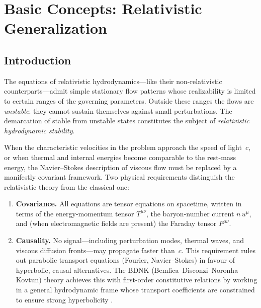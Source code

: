 
\chapter{Basic Concepts: Relativistic Generalization}
\label{ch:rel-1}

\section{Introduction}
\label{sec:rel-1-1}

The equations of relativistic hydrodynamics---like their
non-relativistic counterparts---admit simple stationary flow
patterns whose realizability is limited to certain ranges of the
governing parameters.  Outside these ranges the flows are
\emph{unstable}: they cannot sustain themselves against small
perturbations.  The demarcation of stable from unstable states
constitutes the subject of \emph{relativistic hydrodynamic stability}.

When the characteristic velocities in the problem approach the speed
of light~$c$, or when thermal and internal energies become comparable
to the rest-mass energy, the Navier--Stokes description of viscous
flow must be replaced by a manifestly covariant framework.  Two
physical requirements distinguish the relativistic theory from the
classical one:
\begin{enumerate}
\item \textbf{Covariance.}  All equations are tensor equations on
  spacetime, written in terms of the energy-momentum tensor
  $T^{\mu\nu}$, the baryon-number current $n\, u^{\mu}$, and
  (when electromagnetic fields are present) the Faraday tensor
  $F^{\mu\nu}$.
\item \textbf{Causality.}  No signal---including perturbation modes,
  thermal waves, and viscous diffusion fronts---may propagate faster
  than~$c$.  This requirement rules out parabolic transport equations
  (Fourier, Navier--Stokes) in favour of hyperbolic, causal
  alternatives.  The BDNK (Bemfica--Disconzi--Noronha--Kovtun) theory
  achieves this with first-order constitutive relations by working in
  a general hydrodynamic frame whose transport coefficients are
  constrained to ensure strong hyperbolicity
  \cite{BemficaDN2018,Kovtun2019}.
\end{enumerate}

